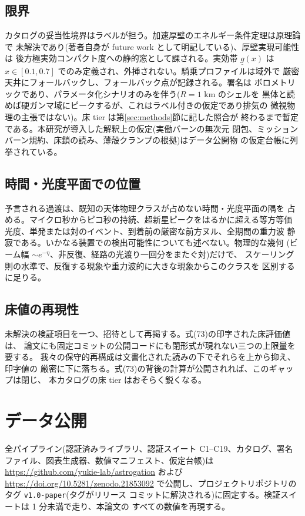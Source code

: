 \documentclass[11pt]{article}
\begin{document}
\subsection{限界}

カタログの妥当性境界はラベルが担う。加速厚壁のエネルギー条件定理は原理論で
未解決であり(著者自身が future work として明記している)、厚壁実現可能性は
後方極実効コンパクト度への静的窓として課される。実効帯 $\underline{g}(x)$
は $x \in [0.1, 0.7]$ でのみ定義され、外挿されない。騎乗プロファイルは域外で
厳密天井にフォールバックし、フォールバック点が記録される。署名は
ボロメトリックであり、パラメータ化シナリオのみを伴う($R = 1$ km のシェルを
黒体と読めば硬ガンマ域にピークするが、これはラベル付きの仮定であり排気の
微視物理の主張ではない)。床 tier は第\ref{sec:methods}節に記した照合が
終わるまで暫定である。本研究が導入した解釈上の仮定(実働バーンの無次元
閉包、ミッションバーン規約、床鎖の読み、薄殻クランプの根拠)はデータ公開物
の仮定台帳に列挙されている。

\subsection{時間・光度平面での位置}

予言される過渡は、既知の天体物理クラスが占めない時間・光度平面の隅を
占める。マイクロ秒からピコ秒の持続、超新星ピークをはるかに超える等方等価
光度、単発または対のイベント、到着前の厳密な前方ヌル、全期間の重力波
静寂である。いかなる装置での検出可能性についても述べない。物理的な幾何
(ビーム幅 $\sim e^{-\eta}$、非反復、経路の光渡り一回分をまたぐ対)だけで、
スケーリング則の水準で、反復する現象や重力波的に大きな現象からこのクラスを
区別するに足りる。

\subsection{床値の再現性}

未解決の検証項目を一つ、招待として再掲する。式(73)の印字された床評価値は、
論文にも固定コミットの公開コードにも閉形式が現れない三つの上限量を要する。
我々の保守的再構成は文書化された読みの下でそれらを上から抑え、印字値の
厳密に下に落ちる。式(73)の背後の計算が公開されれば、このギャップは閉じ、
本カタログの床 tier はおそらく鋭くなる。

\section{データ公開}\label{sec:data}

全パイプライン(認証済みライブラリ、認証スイート C1--C19、カタログ、署名
ファイル、図表生成器、数値マニフェスト、仮定台帳)は
\url{https://github.com/yukie-lab/astrogation} および
\url{https://doi.org/10.5281/zenodo.21853092} で公開し、プロジェクトリポジトリのタグ \texttt{v1.0-paper}(タグがリリース
コミットに解決される)に固定する。検証スイートは 1 分未満で走り、本論文の
すべての数値を再現する。
\end{document}
